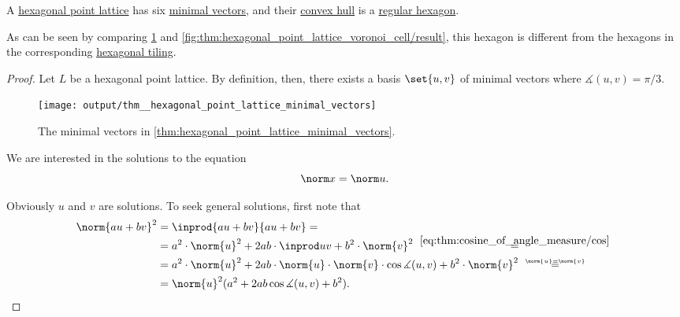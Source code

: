 \begin{proposition}\label{thm:hexagonal_point_lattice_minimal_vectors}
  A \hyperref[def:hexagonal_point_lattice]{hexagonal point lattice} has six \hyperref[def:minimal_lattice_vector]{minimal vectors}, and their \hyperref[def:convex_hull]{convex hull} is a \hyperref[def:regular_polygon]{regular hexagon}.
\end{proposition}
\begin{comments}
  \item As can be seen by comparing \cref{fig:thm:hexagonal_point_lattice_minimal_vectors} and \cref{fig:thm:hexagonal_point_lattice_voronoi_cell/result}, this hexagon is different from the hexagons in the corresponding \hyperref[def:hexagonal_tiling]{hexagonal tiling}.
\end{comments}
\begin{proof}
  Let \( L \) be a hexagonal point lattice. By definition, then, there exists a basis \( \set{ u, v } \) of minimal vectors where \( \measuredangle(u, v) = \pi / 3 \).

  \begin{figure}[!ht]
    \centering
    \texttt{[image: output/thm\_\_hexagonal\_point\_lattice\_minimal\_vectors]}
    \caption{The minimal vectors in \cref{thm:hexagonal_point_lattice_minimal_vectors}.}\label{fig:thm:hexagonal_point_lattice_minimal_vectors}
  \end{figure}

   We are interested in the solutions to the equation
  \begin{equation}\label{eq:thm:hexagonal_point_lattice_minimal_vectors/proof/eq_norm}
    \norm x = \norm u.
  \end{equation}

  Obviously \( u \) and \( v \) are solutions. To seek general solutions, first note that
  \begin{align*}
    \norm{au + bv}^2
    &=
    \inprod {au + bv} {au + bv}
    = \\ &=
    a^2 \cdot \norm{u}^2 + 2ab \cdot \inprod u v + b^2 \cdot \norm{v}^2
    \reloset{\eqref{eq:thm:cosine_of_angle_measure/cos}} = \\ &=
    a^2 \cdot \norm{u}^2 + 2ab \cdot \norm{u} \cdot \norm{v} \cdot \cos\measuredangle(u, v) + b^2 \cdot \norm{v}^2
    \reloset{\norm{u} = \norm{v}} = \\ &=
    \norm{u}^2 (a^2 + 2ab \cos\measuredangle(u, v) + b^2).
  \end{align*}


\end{proof}
